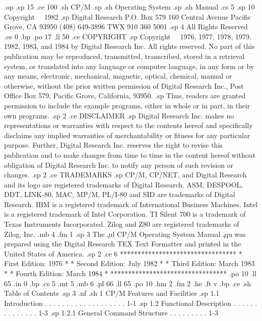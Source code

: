 .op
.sp 15
.ce 100
.sh 
CP/M
.sp
.sh
Operating System
.sp
.sh
Manual
.cs 5
.sp 10
Copyright \ \ 1982
.sp
Digital Research
P.O. Box 579
160 Central Avenue
Pacific Grove, CA 93950
(408) 649-3896
TWX 910 360 5001
.sp 4
All Rights Reserved
.ce 0
.bp
.po 17
.ll 50
.ce
COPYRIGHT
.sp
Copyright \ \ 1976, 1977, 1978, 1979, 1982, 1983, and 1984 by 
Digital Research Inc.  All rights reserved.  No part of this 
publication may be reproduced, transmitted, transcribed, stored 
in a retrieval system, or translated into any language or 
computer language, in any form or by any means, electronic, mechanical, 
magnetic, optical, chemical, manual or otherwise, without the prior 
written permission of Digital Research Inc., Post Office Box 579, 
Pacific Grove, California, 93950.
.sp 
Thus, readers are granted permission to include the example 
programs, either in whole or in part, in their own programs.
.sp 2
.ce
DISCLAIMER
.sp
Digital Research Inc. makes no representations or warranties with
respect to the contents hereof and specifically disclaims
any implied warranties of merchantability or fitness for
any particular purpose.  Further, Digital Research Inc. reserves the
right to revise this publication and to make changes from
time to time in the content hereof without obligation of
Digital Research Inc. to notify any person of such revision or
changes.
.sp 2
.ce
TRADEMARKS
.sp
CP/M, CP/NET, and Digital Research and its logo are registered 
trademarks of Digital Research.  ASM, DESPOOL, DDT, LINK-80, MAC, 
MP/M, PL/I-80 and SID are trademarks of Digital Research.  IBM is 
a registered trademark of International Business Machines.  Intel 
is a registered trademark of Intel Corporation.  TI Silent 700 is 
a trademark of Texas Instruments Incorporated.  Zilog and Z80 are 
registered trademarks of Zilog, Inc.
.mb 4
.fm 1
.sp 3
The \c
.ul 
CP/M Operating System Manual \c
.qu
was prepared using the Digital Research TEX Text Formatter and printed
in the United States of America.
.sp 2
.ce 6
*********************************
*   First Edition:  1976        *
*  Second Edition:  July 1982   *
*   Third Edition:  March 1983  *
*  Fourth Edition:  March 1984  *
*********************************
.po 10
.ll 65
.in 0
.bp
.cs 5
.mt 5
.mb 6
.pl 66
.ll 65
.po 10
.hm 2
.fm 2
.he 
.ft                                v
.bp
.ce
.sh
Table of Contents
.sp 3
.nf
.sh
1  CP/M Features and Facilities 
.sp
   1.1  Introduction  . . . . . . . . . . . . . . . . . . .   1-1 
.sp
   1.2  Functional Description  . . . . . . . . . . . . . .   1-3 
.sp
        1.2.1  General Command Structure  . . . . . . . . .   1-3 
